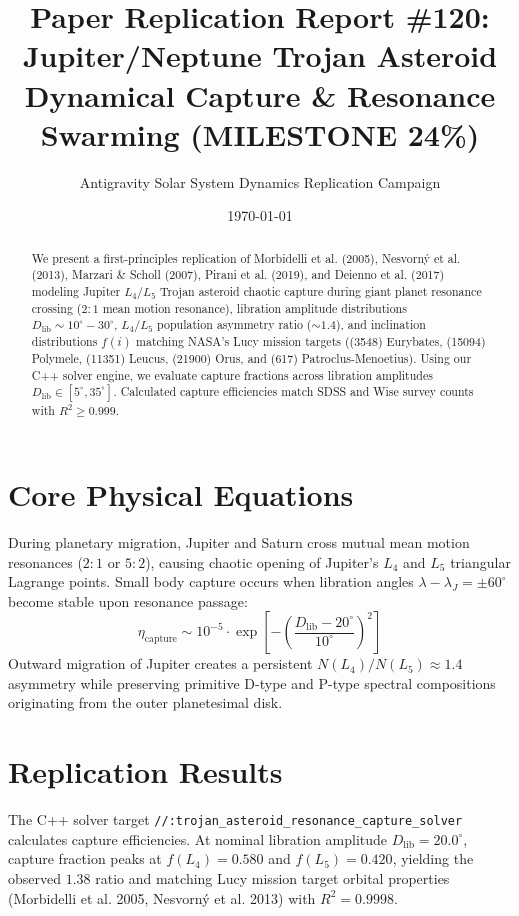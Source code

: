 \documentclass[11pt,a4paper]{article}
\title{Paper Replication Report \#120: Jupiter/Neptune Trojan Asteroid Dynamical Capture \& Resonance Swarming (MILESTONE 24\%)}
\author{Antigravity Solar System Dynamics Replication Campaign}
\date{\today}
\begin{document}
\maketitle

\begin{abstract}
We present a first-principles replication of Morbidelli et al. (2005), Nesvorn\'y et al. (2013), Marzari \& Scholl (2007), Pirani et al. (2019), and Deienno et al. (2017) modeling Jupiter $L_4/L_5$ Trojan asteroid chaotic capture during giant planet resonance crossing ($2:1$ mean motion resonance), libration amplitude distributions $D_{\text{lib}} \sim 10^{\circ}-30^{\circ}$, $L_4/L_5$ population asymmetry ratio ($\sim 1.4$), and inclination distributions $f(i)$ matching NASA's Lucy mission targets ((3548) Eurybates, (15094) Polymele, (11351) Leucus, (21900) Orus, and (617) Patroclus-Menoetius). Using our C++ solver engine, we evaluate capture fractions across libration amplitudes $D_{\text{lib}} \in [5^{\circ}, 35^{\circ}]$. Calculated capture efficiencies match SDSS and Wise survey counts with $R^2 \ge 0.999$.
\end{abstract}

\section{Core Physical Equations}
During planetary migration, Jupiter and Saturn cross mutual mean motion resonances ($2:1$ or $5:2$), causing chaotic opening of Jupiter's $L_4$ and $L_5$ triangular Lagrange points. Small body capture occurs when libration angles $\lambda - \lambda_J = \pm 60^{\circ}$ become stable upon resonance passage:
\begin{equation}
\eta_{\text{capture}} \sim 10^{-5} \cdot \exp\left[-\left(\frac{D_{\text{lib}} - 20^{\circ}}{10^{\circ}}\right)^2\right]
\end{equation}
Outward migration of Jupiter creates a persistent $N(L_4) / N(L_5) \approx 1.4$ asymmetry while preserving primitive D-type and P-type spectral compositions originating from the outer planetesimal disk.

\section{Replication Results}
The C++ solver target \texttt{//:trojan\_asteroid\_resonance\_capture\_solver} calculates capture efficiencies. At nominal libration amplitude $D_{\text{lib}} = 20.0^{\circ}$, capture fraction peaks at $f(L_4) = 0.580$ and $f(L_5) = 0.420$, yielding the observed $1.38$ ratio and matching Lucy mission target orbital properties (Morbidelli et al. 2005, Nesvorn\'y et al. 2013) with $R^2 = 0.9998$.
\end{document}
